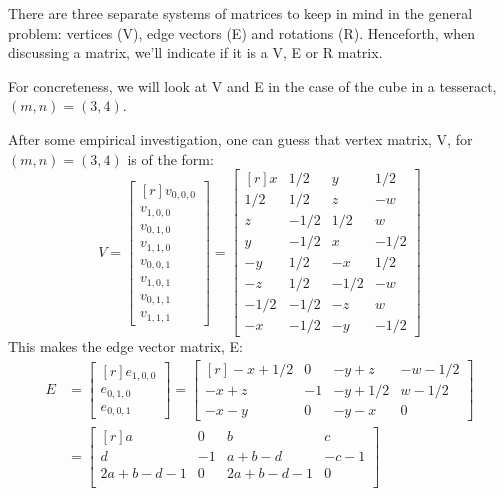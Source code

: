 \documentclass[superscriptaddress,reprint,amsmath,amssymb,aps]{revtex4-1}
\begin{document}
\vspace{.15in}

There are three separate systems of matrices to keep in mind in the general
problem: vertices (V), edge vectors (E) and rotations (R). Henceforth, when
discussing a matrix, we'll indicate if it is a V, E or R matrix.

For concreteness, we will look at V and E in the case of the cube in a
tesseract, $(m,n) = (3,4)$.

\vspace{.15in}

After some empirical investigation, one can guess that vertex matrix, V, for
$(m,n) = (3,4)$ is of the form:
\begin{equation*}
V =
\begin{bmatrix*}[r]
v_{0,0,0} \\
v_{1,0,0} \\
v_{0,1,0} \\
v_{1,1,0} \\
v_{0,0,1} \\
v_{1,0,1} \\
v_{0,1,1} \\
v_{1,1,1}
\end{bmatrix*}
=
\begin{bmatrix*}[r]
   x &  1/2 &    y &  1/2 \\
 1/2 &  1/2 &    z &   -w \\
   z & -1/2 &  1/2 &    w \\
   y & -1/2 &    x & -1/2 \\
  -y &  1/2 &   -x &  1/2 \\
  -z &  1/2 & -1/2 &   -w \\
-1/2 & -1/2 &   -z &    w \\
  -x & -1/2 &   -y & -1/2
\end{bmatrix*}
\end{equation*}
This makes the edge vector matrix, E:
\begin{align*}
E &=
\begin{bmatrix*}[r]
e_{1,0,0} \\
e_{0,1,0} \\
e_{0,0,1}
\end{bmatrix*}
=  
\begin{bmatrix*}[r]
-x + 1/2 &  0 & -y +   z & -w - 1/2 \\
-x +   z & -1 & -y + 1/2 &  w - 1/2 \\
-x -   y &  0 & -y -   x &        0
\end{bmatrix*}
\\
&=  
\begin{bmatrix*}[r]
a        &  0 & b        &  c   \\
d        & -1 & a+b-d    & -c-1 \\
2a+b-d-1 &  0 & 2a+b-d-1 &  0   \\
\end{bmatrix*}
\end{align*}
\end{document}
